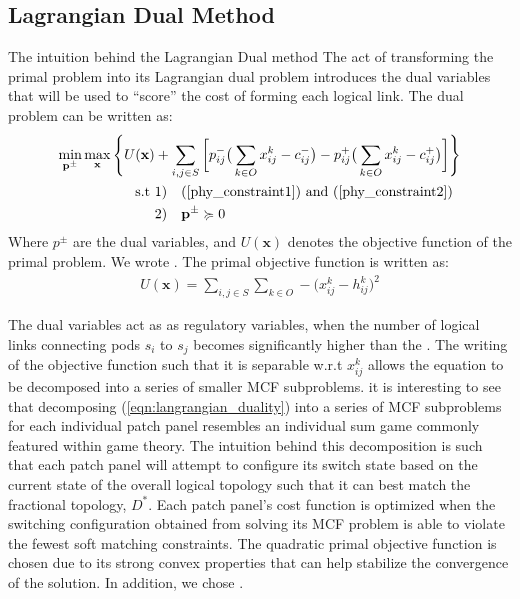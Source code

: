 \documentclass[sigconf]{acmart}
\theoremstyle{definition}
\begin{document}
\subsection{Lagrangian Dual Method}\label{section_lagrangian_dual}
The intuition behind the Lagrangian Dual method \cite{low1999optimization}
The act of transforming the primal problem into its Lagrangian dual problem introduces the dual variables that will be used to ``score'' the cost of forming each logical link. 
The dual problem can be written as:
\begin{equation}
\begin{aligned}
\min\limits_{\mathbf{p}^\pm}\max\limits_{\mathbf{x}}\Bigg\{U(\mathbf{x}) & + \sum\limits_{i, j \in S} \bigg[p_{ij}^- \big( \sum\limits_{k \in O}x_{ij}^k - c_{ij}^-\big) -p_{ij}^+ \big( \sum\limits_{k \in O}x_{ij}^k - c_{ij}^+ \big) \bigg] \Bigg\} \\
\text{s.t } & 1) \quad (\ref{phy_constraint1}) \text{ and } (\ref{phy_constraint2})\\
\text{} & 2) \quad \mathbf{p^\pm}  \succcurlyeq 0
\end{aligned}
\label{eqn:langrangian_duality}
\end{equation}
Where $p^\pm$ are the dual variables, and $U(\mathbf{x})$ denotes the objective function of the primal problem. We wrote . The primal objective function is written as:
\begin{equation} 
\begin{aligned}
U(\mathbf{x}) = \sum\limits_{i, j \in S} \sum\limits_{k \in O} -\big( x_{ij}^k - h_{ij}^k\big)^2
\end{aligned}
\label{eqn:lagrangian_primal_objective}
\end{equation}

The dual variables act as as regulatory variables, when the number of logical links connecting pods $s_i$ to $s_j$ becomes significantly higher than the . The writing of the objective function such that it is separable w.r.t $x_{ij}^k$ allows the equation to be decomposed into a series of smaller MCF subproblems. it is interesting to see that decomposing (\ref{eqn:langrangian_duality}) into a series of MCF subproblems for each individual patch panel resembles an individual sum game commonly featured within game theory. The intuition behind this decomposition is such that each patch panel will attempt to configure its switch state based on the current state of the overall logical topology such that it can best match the fractional topology, $D^*$. Each patch panel's cost function is optimized when the switching configuration obtained from solving its MCF problem is able to violate the fewest soft matching constraints. The quadratic primal objective function is chosen due to its strong convex properties that can help stabilize the convergence of the solution. In addition, we chose . 
\end{document}
